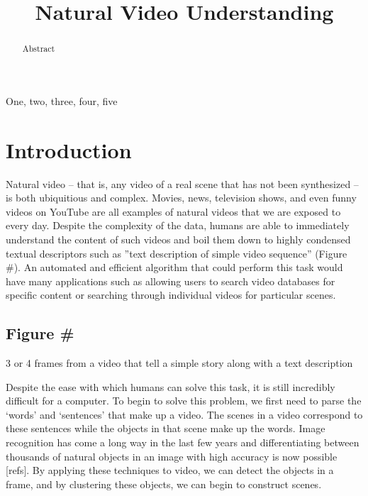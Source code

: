 \documentclass{article}
\title{Natural Video Understanding}
\begin{document}
\maketitle

\begin{abstract}
Abstract
\end{abstract}

\begin{keywords}
One, two, three, four, five
\end{keywords}

\section{Introduction}
\label{sec:intro}

Natural video -- that is, any video of a real scene that has not been synthesized -- is both ubiquitious and complex.
Movies, news, television shows, and even funny videos on YouTube are all examples of natural videos that we are exposed to every day.
Despite the complexity of the data, humans are able to immediately understand the content of such videos and boil them down to highly condensed textual descriptors such as ''text description of simple video sequence'' (Figure \#).
An automated and efficient algorithm that could perform this task would have many applications such as allowing users to search video databases for specific content or searching through individual videos for particular scenes.

\subsection{Figure \#}
3 or 4 frames from a video that tell a simple story along with a text description

Despite the ease with which humans can solve this task, it is still incredibly difficult for a computer.
To begin to solve this problem, we first need to parse the `words' and `sentences' that make up a video.
The scenes in a video correspond to these sentences while the objects in that scene make up the words.
Image recognition has come a long way in the last few years and differentiating between thousands of natural objects in an image with high accuracy is now possible [refs].
By applying these techniques to video, we can detect the objects in a frame, and by clustering these objects, we can begin to construct scenes.
\end{document}
